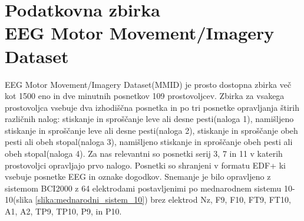 \section{Podatkovna zbirka\\ EEG Motor Movement/Imagery Dataset}
EEG Motor Movement/Imagery Dataset(MMID) je prosto dostopna zbirka več kot 1500 eno in dve minutnih posnetkov 109 prostovoljcev. Zbirka za vsakega prostovoljca vsebuje dva izhodiščna posnetka in po tri posnetke opravljanja štirih različnih nalog: stiskanje in sproščanje leve ali desne pesti(naloga 1), namišljeno stiskanje in sproščanje leve ali desne pesti(naloga 2), stiskanje in sproščanje obeh pesti ali obeh stopal(naloga 3), namišljeno stiskanje in sproščanje obeh pesti ali obeh stopal(naloga 4). Za nas relevantni so posnetki serij 3, 7 in 11 v katerih prostovoljci opravljajo prvo nalogo. Posnetki so shranjeni v formatu EDF+ ki vsebuje posnetke EEG in oznake dogodkov. Snemanje je bilo opravljeno z sistemom BCI2000 z 64 elektrodami postavljenimi po mednarodnem sistemu 10-10(slika \ref{slika:mednarodni_sistem_10}) brez elektrod Nz, F9, F10, FT9, FT10, A1, A2, TP9, TP10, P9, in P10.\cite{schalkBCI2000GeneralpurposeBraincomputer2004,schalkEEGMotorMovement2009}

